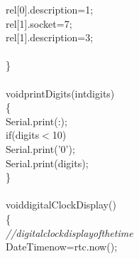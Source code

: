 \documentclass[a4paper, 12pt]{article}
\newcommand\SPC{\hspace*{0.6em}}
\newcommand\QOT{\mbox{\char 34}}
\newcommand{\CppACharacter}[1]{\textcolor[rgb]{0.2,0.4,1}{#1}}
\newcommand{\CppAComment}[1]{\textit{\textcolor[rgb]{0.2,0.4,1}{#1}}}
\newcommand{\CppAIdentifier}[1]{\textcolor[rgb]{0,1,0}{#1}}
\newcommand{\CppANumber}[1]{\textcolor[rgb]{0,0,1}{#1}}
\newcommand{\CppAReservedWord}[1]{\textcolor[rgb]{0,0.5,0}{#1}}
\newcommand{\CppASpace}[1]{\textcolor[rgb]{1,1,1}{\colorbox[rgb]{0,0,0}{#1}}}
\newcommand{\CppAString}[1]{\textcolor[rgb]{0.76,0.76,0.76}{#1}}
\newcommand{\CppASymbol}[1]{\textcolor[rgb]{1,0,0}{#1}}
\begin{document}
\begin{ttfamily}
\CppASpace{\SPC \SPC }\CppAIdentifier{rel}\CppASymbol{[}\CppANumber{0}\CppASymbol{]}\CppASymbol{.}\CppAIdentifier{description}\CppASpace{\SPC }\CppASymbol{=}\CppASpace{\SPC }\CppANumber{1}\CppASymbol{;}\CppASpace{\SPC \SPC }\\
\CppASpace{\SPC \SPC }\CppAIdentifier{rel}\CppASymbol{[}\CppANumber{1}\CppASymbol{]}\CppASymbol{.}\CppAIdentifier{socket}\CppASpace{\SPC }\CppASymbol{=}\CppASpace{\SPC }\CppANumber{7}\CppASymbol{;}\\
\CppASpace{\SPC \SPC }\CppAIdentifier{rel}\CppASymbol{[}\CppANumber{1}\CppASymbol{]}\CppASymbol{.}\CppAIdentifier{description}\CppASpace{\SPC }\CppASymbol{=}\CppASpace{\SPC }\CppANumber{3}\CppASymbol{;}\\
\\
\CppASpace{\SPC }\CppASymbol{\}}\\
\CppASpace{\SPC }\\
\CppAReservedWord{void}\CppASpace{\SPC }\CppAIdentifier{printDigits}\CppASymbol{(}\CppAReservedWord{int}\CppASpace{\SPC }\CppAIdentifier{digits}\CppASymbol{)}\\
\CppASymbol{\{}\\
\CppASpace{\SPC \SPC }\CppAIdentifier{Serial}\CppASymbol{.}\CppAIdentifier{print}\CppASymbol{(}\CppAString{\QOT :\QOT }\CppASymbol{)}\CppASymbol{;}\\
\CppASpace{\SPC \SPC }\CppAReservedWord{if}\CppASymbol{(}\CppAIdentifier{digits}\CppASpace{\SPC }\CppASymbol{$<$}\CppASpace{\SPC }\CppANumber{10}\CppASymbol{)}\\
\CppASpace{\SPC \SPC \SPC \SPC }\CppAIdentifier{Serial}\CppASymbol{.}\CppAIdentifier{print}\CppASymbol{(}\CppACharacter{'0'}\CppASymbol{)}\CppASymbol{;}\\
\CppASpace{\SPC \SPC }\CppAIdentifier{Serial}\CppASymbol{.}\CppAIdentifier{print}\CppASymbol{(}\CppAIdentifier{digits}\CppASymbol{)}\CppASymbol{;}\\
\CppASymbol{\}}\\
\\
\CppAReservedWord{void}\CppASpace{\SPC }\CppAIdentifier{digitalClockDisplay}\CppASymbol{(}\CppASymbol{)}\\
\CppASymbol{\{}\\
\CppASpace{\SPC \SPC }\CppAComment{//\SPC digital\SPC clock\SPC display\SPC of\SPC the\SPC time}\\
\CppASpace{\SPC \SPC }\CppAIdentifier{DateTime}\CppASpace{\SPC }\CppAIdentifier{now}\CppASpace{\SPC }\CppASymbol{=}\CppASpace{\SPC }\CppAIdentifier{rtc}\CppASymbol{.}\CppAIdentifier{now}\CppASymbol{(}\CppASymbol{)}\CppASymbol{;}\\

\end{ttfamily}
\end{document}
